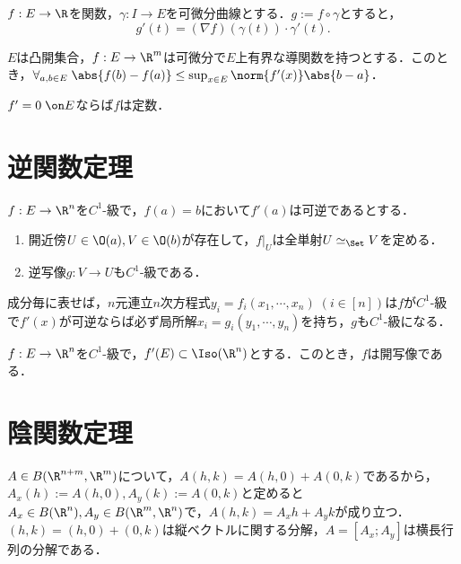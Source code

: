 \documentclass[uplatex, dvipdfmx]{jsreport}
\begin{document}
\begin{proposition}
    $f:E\to\R$を関数，$\gamma:I\to E$を可微分曲線とする．$g:=f\circ\gamma$とすると，
    \[g'(t)=(\nabla f)(\gamma(t))\cdot\gamma'(t).\]
\end{proposition}

\begin{theorem}[平均値の定理の一般化]
    $E$は凸開集合，$f:E\to\R^m$は可微分で$E$上有界な導関数を持つとする．このとき，$\forall_{a,b\in E}\;\abs{f(b)-f(a)}\le\sup_{x\in E}\norm{f'(x)}\abs{b-a}$．
\end{theorem}
\begin{corollary}
    $f'=0\;\on E$ならば$f$は定数．
\end{corollary}

\section{逆関数定理}

\begin{theorem}
    $f:E\to\R^n$を$C^1$-級で，$f(a)=b$において$f'(a)$は可逆であるとする．
    \begin{enumerate}
        \item 開近傍$U\in\O(a),V\in\O(b)$が存在して，$f|_U$は全単射$U\simeq_\Set V$を定める．
        \item 逆写像$g:V\to U$も$C^1$-級である．
    \end{enumerate}
\end{theorem}
\begin{remarks}[陽関数定理としての見方]
    成分毎に表せば，$n$元連立$n$次方程式$y_i=f_i(x_1,\cdots,x_n)\;(i\in[n])$は$f$が$C^1$-級で$f'(x)$が可逆ならば必ず局所解$x_i=g_i(y_1,\cdots,y_n)$を持ち，$g$も$C^1$-級になる．
\end{remarks}

\begin{corollary}
    $f:E\to\R^n$を$C^1$-級で，$f'(E)\subset\Iso(\R^n)$とする．このとき，$f$は開写像である．
\end{corollary}

\section{陰関数定理}

\begin{remark}
    $A\in B(\R^{n+m},\R^m)$について，$A(h,k)=A(h,0)+A(0,k)$であるから，$A_x(h):=A(h,0),A_y(k):=A(0,k)$と定めると$A_x\in B(\R^n),A_y\in B(\R^m,\R^n)$で，$A(h,k)=A_xh+A_yk$が成り立つ．
    $(h,k)=(h,0)+(0,k)$は縦ベクトルに関する分解，$A=[A_x;A_y]$は横長行列の分解である．
\end{remark}
\end{document}
